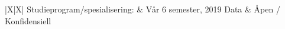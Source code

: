 \begin{titlepage}
	\noindent\begin{tabularx}{\textwidth}{ |X|X| }
  		\hline
  		 \tabularnewline
		 \tabularnewline
		 \tabularnewline
  		\hline
		Studieprogram/spesialisering: & Vår 6 semester, 2019
		Data & Åpen / Konfidensiell
		\hline
	\end{tabularx}
\end{titlepage}